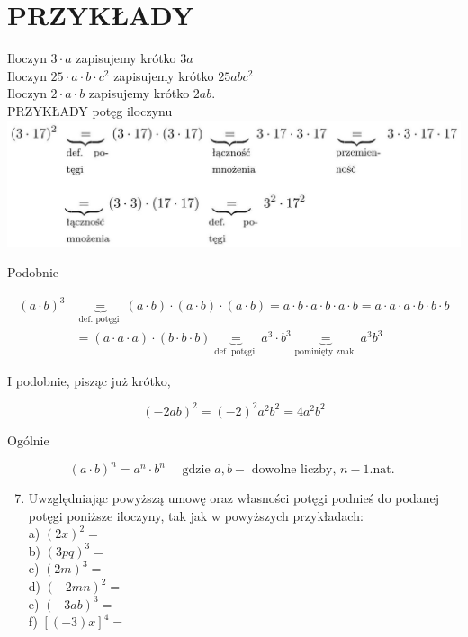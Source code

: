 \documentclass[10pt]{article}
\begin{document}
\section*{PRZYKŁADY}
Iloczyn \(3 \cdot a\) zapisujemy krótko \(3 a\)\\
Iloczyn \(25 \cdot a \cdot b \cdot c^{2}\) zapisujemy krótko \(25 a b c^{2}\)\\
Iloczyn \(2 \cdot a \cdot b\) zapisujemy krótko \(2 a b\).\\
PRZYKŁADY potęg iloczynu\\
\includegraphics[max width=\textwidth, center]{2024_11_21_8f01584889ff06348ae7g-082}

Podobnie

\[
\begin{aligned}
(a \cdot b)^{3} & \underbrace{=}_{\text {def. potęgi }}(a \cdot b) \cdot(a \cdot b) \cdot(a \cdot b)=a \cdot b \cdot a \cdot b \cdot a \cdot b=a \cdot a \cdot a \cdot b \cdot b \cdot b \\
& =(a \cdot a \cdot a) \cdot(b \cdot b \cdot b) \underbrace{=}_{\text {def. potęgi }} a^{3} \cdot b^{3} \underbrace{=}_{\text {pominięty znak }} a^{3} b^{3}
\end{aligned}
\]

I podobnie, pisząc już krótko,

\[
(-2 a b)^{2}=(-2)^{2} a^{2} b^{2}=4 a^{2} b^{2}
\]

Ogólnie

\[
(a \cdot b)^{n}=a^{n} \cdot b^{n} \quad \text { gdzie } a, b-\text { dowolne liczby, } n-1 \text {.nat. }
\]

\begin{enumerate}
  \setcounter{enumi}{6}
  \item Uwzględniając powyższą umowę oraz własności potęgi podnieś do podanej potęgi poniższe iloczyny, tak jak w powyższych przykładach:\\
a) \((2 x)^{2}=\)\\
b) \((3 p q)^{3}=\)\\
c) \((2 m)^{3}=\)\\
d) \((-2 m n)^{2}=\)\\
e) \((-3 a b)^{3}=\)\\
f) \([(-3) x]^{4}=\)
\end{enumerate}
\end{document}
